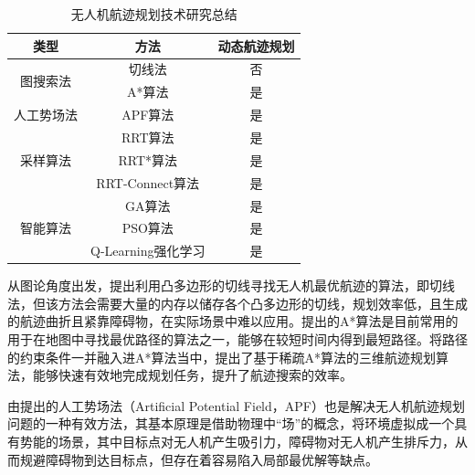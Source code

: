 \begin{table}[!htbp]
    \caption{无人机航迹规划技术研究总结}
    \label{tab:无人机航迹规划技术研究总结}
    \centering
    \begin{tabular}{c c c}
        \toprule
        \textbf{类型} & \textbf{方法} & \textbf{动态航迹规划} \\
        \midrule
        \multirow{2}{*}{图搜索法} & 切线法\citep{rohnert1986ShortestPathsPlane} & 否 \\
        & A*算法\citep{hart1968FormalBasisHeuristicb, li2002YiZhongSanWeiHangJiKuaiSuSouSuoFangFa} & 是 \\
        \cmidrule(lr){1-3}
        人工势场法 & APF算法\citep{khatib1985RealtimeObstacleAvoidance, zhang2018JiYuGaiJinRenGongShiChangDeWuRenJiBianDuiBiZhangKongZhiYanJiu} & 是\\
        \cmidrule(lr){1-3}
        \multirow{3}{*}{采样算法} & RRT算法\citep{lin2017SamplingBasedPathPlanning} & 是\\
        & RRT*算法\citep{karaman2011SamplingbasedAlgorithmsOptimal, li2002YiZhongSanWeiHangJiKuaiSuSouSuoFangFa} & 是\\
        & RRT-Connect算法\citep{zhang2018ImprovedPathPlanninga} & 是\\
        \cmidrule(lr){1-3}
        \multirow{3}{*}{智能算法} & GA算法\citep{sonmez2015OptimalPathPlanning} & 是 \\
        & PSO算法\citep{wang2014ThreedimensionalPathPlanning} & 是 \\
        & Q-Learning强化学习\citep{yan2018PathPlanningAlgorithm} & 是 \\
        \bottomrule
    \end{tabular}
\end{table}

从图论角度出发，\citet{rohnert1986ShortestPathsPlane}提出利用凸多边形的切线寻找无人机最优航迹的算法，即切线法，但该方法会需要大量的内存以储存各个凸多边形的切线，规划效率低，且生成的航迹曲折且紧靠障碍物，在实际场景中难以应用。\citet{hart1968FormalBasisHeuristicb}提出的A*算法是目前常用的用于在地图中寻找最优路径的算法之一，能够在较短时间内得到最短路径。\citet{li2002YiZhongSanWeiHangJiKuaiSuSouSuoFangFa}将路径的约束条件一并融入进A*算法当中，提出了基于稀疏A*算法的三维航迹规划算法，能够快速有效地完成规划任务，提升了航迹搜索的效率。

由\citet{khatib1985RealtimeObstacleAvoidance}提出的人工势场法（Artificial Potential Field，APF）也是解决无人机航迹规划问题的一种有效方法，其基本原理是借助物理中“场”的概念，将环境虚拟成一个具有势能的场景，其中目标点对无人机产生吸引力，障碍物对无人机产生排斥力，从而规避障碍物到达目标点，但存在着容易陷入局部最优解等缺点。

